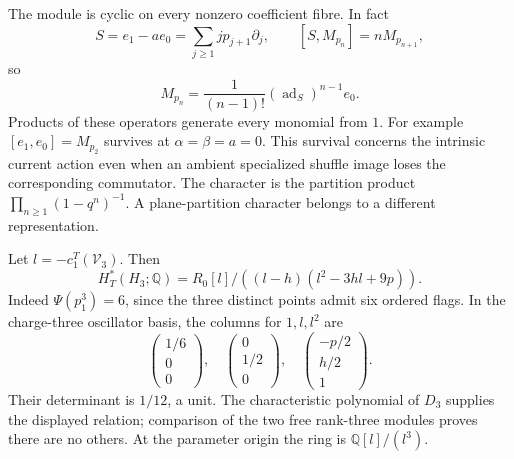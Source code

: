 The module is cyclic on every nonzero coefficient fibre. In fact
\[
 S=e_1-ae_0=\sum_{j\geq1}jp_{j+1}\partial_j,\qquad
 [S,M_{p_n}]=nM_{p_{n+1}},
\]
so
\begin{equation}\label{cyrep:eq:cyclic}
 M_{p_n}=\frac{1}{(n-1)!}
                (\operatorname{ad}_S)^{n-1}e_0.
\end{equation}
Products of these operators generate every monomial from \(1\).
For example \([e_1,e_0]=M_{p_2}\) survives at
\(\alpha=\beta=a=0\). This survival concerns the intrinsic
current action even when an ambient specialized shuffle image
loses the corresponding commutator.
The character is the partition product
\(\prod_{n\geq1}(1-q^n)^{-1}\). A plane-partition character
belongs to a different representation.

\begin{example}\label{cyrep:ex:charge-three}
Let \(l=-c_1^T(\mathcal V_3)\). Then
\[
 H_T^*(H_3;\mathbb Q)
 =R_0[l]/((l-h)(l^2-3hl+9p)).
\]
Indeed \(\Psi(p_1^3)=6\), since the three distinct points admit six
ordered flags. In the charge-three oscillator basis, the columns
for \(1,l,l^2\) are
\[
 \begin{pmatrix}1/6\\0\\0\end{pmatrix},\quad
 \begin{pmatrix}0\\1/2\\0\end{pmatrix},\quad
 \begin{pmatrix}-p/2\\h/2\\1\end{pmatrix}.
\]
Their determinant is \(1/12\), a unit. The characteristic
polynomial of \(D_3\) supplies the displayed relation; comparison
of the two free rank-three modules proves there are no others.
At the parameter origin the ring is \(\mathbb Q[l]/(l^3)\).
\end{example}


